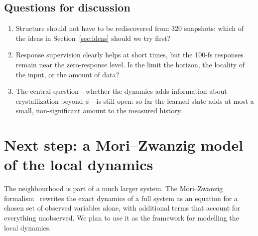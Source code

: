 \documentclass[11pt,a4paper]{article}
\numberwithin{equation}{section}
\begin{document}
\subsection*{Questions for discussion}
\begin{enumerate}[leftmargin=1.5em]
\item Structure should not have to be rediscovered from 320 snapshots: which of the
  ideas in Section~\ref{sec:ideas} should we try first?
\item Response supervision clearly helps at short times, but the 100-fs responses
  remain near the zero-response level. Is the limit the horizon, the locality of the
  input, or the amount of data?
\item The central question---whether the dynamics adds information about
  crystallization beyond $\phi$---is still open: so far the learned state adds at most
  a small, non-significant amount to the measured history.
\end{enumerate}

\section{Next step: a Mori--Zwanzig model of the local dynamics}
\label{sec:mz}

The neighbourhood is part of a much larger system. The Mori--Zwanzig
formalism~\cite{mori,zwanzig} rewrites the exact dynamics of a full system as an
equation for a chosen set of observed variables alone, with additional terms that
account for everything unobserved. We plan to use it as the framework for modelling
the local dynamics.
\end{document}
